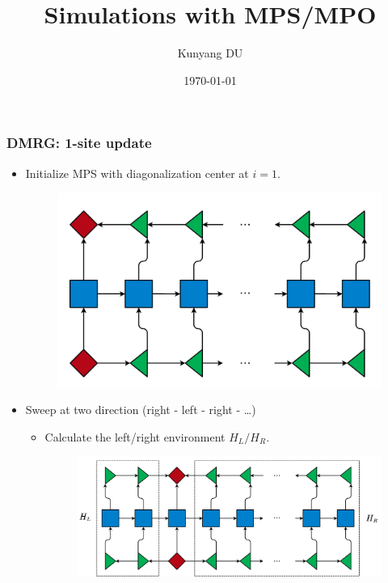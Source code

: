 \documentclass{beamer}
\title{Simulations with MPS/MPO}
\author{Kunyang DU}
\institute{Institue of Theoretical Physics}
\date{\today}
\begin{document}
\begin{frame}
	\titlepage
\end{frame}

\begin{frame}
	\frametitle{DMRG: 1-site update}
	\begin{multicols*}{2}
	\begin{itemize}
		\item Initialize MPS with diagonalization center at $i=1$.
		\begin{figure}[H]
			\includegraphics[width=1. \linewidth]{images/Initialization.pdf}
		\end{figure}
		\newpage
		\item Sweep at two direction (right - left - right - \dots)
		\begin{itemize}
			\item Calculate the left/right environment $H_L/H_R$.
			\begin{figure}[H]
				\includegraphics[width=1. \linewidth]{images/LRenv1.pdf}
			\end{figure}
		\end{itemize}
	\end{itemize}
	\end{multicols*}
\end{frame}
\end{document}
